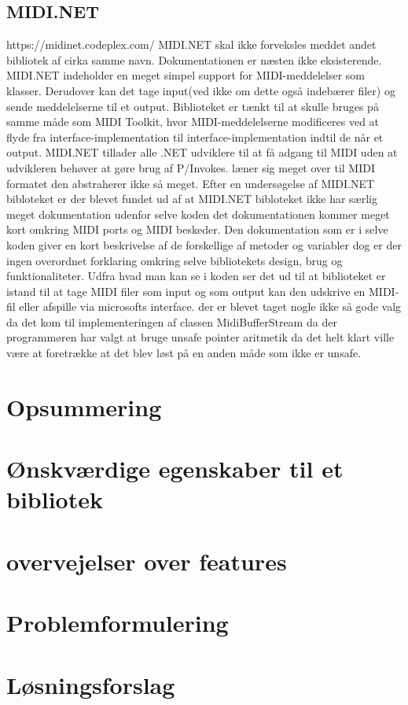 \subsection{MIDI.NET}
https://midinet.codeplex.com/ 
MIDI.NET skal ikke forveksles meddet andet bibliotek af cirka samme navn. Dokumentationen er næsten ikke eksisterende.
MIDI.NET indeholder en meget simpel support for MIDI-meddelelser som klasser. Derudover kan det tage input(ved ikke om dette også indebærer filer) og sende meddelelserne til et output. Biblioteket er tænkt til at skulle bruges på samme måde som MIDI Toolkit, hvor MIDI-meddelelserne modificeres ved at flyde fra interface-implementation til interface-implementation indtil de når et output. 
MIDI.NET tillader alle .NET udviklere til at få adgang til MIDI uden at udvikleren behøver at gøre brug af P/Invokes.
læner sig meget over til MIDI formatet den abstraherer ikke så meget.
Efter en undersøgelse af MIDI.NET bibloteket er der blevet fundet ud af at MIDI.NET bibloteket ikke har særlig meget dokumentation udenfor selve koden det dokumentationen kommer meget kort omkring MIDI ports og MIDI beskeder. Den dokumentation som er i selve koden giver en kort beskrivelse af de forskellige af metoder og variabler dog er der ingen overordnet forklaring omkring selve bibliotekets design, brug og funktionaliteter.
Udfra hvad man kan se i koden ser det ud til at biblioteket er istand til at tage MIDI filer som input og som output kan den udskrive en MIDI-fil eller afspille via microsofts interface.
der er blevet taget nogle ikke så gode valg da det kom til implementeringen af classen MidiBufferStream da der programmøren har valgt at bruge unsafe pointer aritmetik da det helt klart ville være at foretrække at det blev løst på en anden måde som ikke er unsafe.  

\section{Opsummering}

\section{Ønskværdige egenskaber til et bibliotek}

\section{overvejelser over features}

\section{Problemformulering}

\section{Løsningsforslag}


%
%
